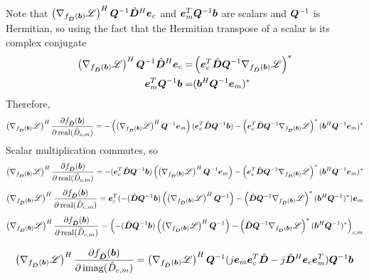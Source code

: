 \begin{appendices}
Note that $\left(\nabla_{f_{\hat{\bm{D}}}(\bm{b})} \mathscr{L}\right)^H\bm{Q}^{-1}\hat{\bm{D}}^H\bm{e}_c$ and $\bm{e}_m^T\bm{Q}^{-1}\bm{b}$ are scalars and $\bm{Q}^{-1}$ is Hermitian, so using the fact that the Hermitian transpose of a scalar is its complex conjugate
\begin{equation}
\begin{split}
\left(\nabla_{f_{\hat{\bm{D}}}(\bm{b})} \mathscr{L}\right)^H\bm{Q}^{-1}\hat{\bm{D}}^H\bm{e}_c = & \left(\bm{e}_c^T\hat{\bm{D}}\bm{Q}^{-1}\nabla_{f_{\hat{\bm{D}}}(\bm{b})} \mathscr{L}\right)^*
\\
\bm{e}_m^T\bm{Q}^{-1}\bm{b} = & (\bm{b}^H\bm{Q}^{-1}\bm{e}_m)^*
\end{split}
\end{equation}
Therefore,
\begin{equation}
\left(\nabla_{f_{\hat{\bm{D}}}(\bm{b})} \mathscr{L}\right)^H\frac{\partial f_{\hat{\bm{D}}}(\bm{b})}{\partial \operatorname{real}(\hat{D}_{c,m})} = -\left(\left(\nabla_{f_{\hat{\bm{D}}}(\bm{b})} \mathscr{L}\right)^H\bm{Q}^{-1}\bm{e}_m\right)(\bm{e}_c^T\hat{\bm{D}}\bm{Q}^{-1}\bm{b}) - \left(\bm{e}_c^T\hat{\bm{D}}\bm{Q}^{-1}\nabla_{f_{\hat{\bm{D}}}(\bm{b})} \mathscr{L}\right)^* (\bm{b}^H\bm{Q}^{-1}\bm{e}_m)^*
\end{equation}
Scalar multiplication commutes, so
\begin{equation}
\left(\nabla_{f_{\hat{\bm{D}}}(\bm{b})} \mathscr{L}\right)^H\frac{\partial f_{\hat{\bm{D}}}(\bm{b})}{\partial \operatorname{real}(\hat{D}_{c,m})} = -(\bm{e}_c^T\hat{\bm{D}}\bm{Q}^{-1}\bm{b})\left(\left(\nabla_{f_{\hat{\bm{D}}}(\bm{b})} \mathscr{L}\right)^H\bm{Q}^{-1}\bm{e}_m\right) - \left(\bm{e}_c^T\hat{\bm{D}}\bm{Q}^{-1}\nabla_{f_{\hat{\bm{D}}}(\bm{b})} \mathscr{L}\right)^* (\bm{b}^H\bm{Q}^{-1}\bm{e}_m)^*
\end{equation}
\begin{equation}
\left(\nabla_{f_{\hat{\bm{D}}}(\bm{b})} \mathscr{L}\right)^H\frac{\partial f_{\hat{\bm{D}}}(\bm{b})}{\partial \operatorname{real}(\hat{D}_{c,m})} = \bm{e}_c^T(-(\hat{\bm{D}}\bm{Q}^{-1}\bm{b})\left(\left(\nabla_{f_{\hat{\bm{D}}}(\bm{b})} \mathscr{L}\right)^H\bm{Q}^{-1}\right) - \left(\hat{\bm{D}}\bm{Q}^{-1}\nabla_{f_{\hat{\bm{D}}}(\bm{b})} \mathscr{L}\right)^* (\bm{b}^H\bm{Q}^{-1})^*)\bm{e}_m
\end{equation}
\begin{equation}
\left(\nabla_{f_{\hat{\bm{D}}}(\bm{b})} \mathscr{L}\right)^H\frac{\partial f_{\hat{\bm{D}}}(\bm{b})}{\partial \operatorname{real}(\hat{D}_{c,m})} = \left(-(\hat{\bm{D}}\bm{Q}^{-1}\bm{b})\left(\left(\nabla_{f_{\hat{\bm{D}}}(\bm{b})} \mathscr{L}\right)^H\bm{Q}^{-1}\right) - \left(\hat{\bm{D}}\bm{Q}^{-1}\nabla_{f_{\hat{\bm{D}}}(\bm{b})} \mathscr{L}\right)^* (\bm{b}^H\bm{Q}^{-1})^*\right)_{c,m}
\end{equation}

\begin{equation}
\left(\nabla_{f_{\hat{\bm{D}}}(\bm{b})} \mathscr{L}\right)^H\frac{\partial f_{\hat{\bm{D}}}(\bm{b})}{\partial \operatorname{imag}(\hat{D}_{c,m})} = \left(\nabla_{f_{\hat{\bm{D}}}(\bm{b})} \mathscr{L}\right)^H\bm{Q}^{-1}(j\bm{e}_m\bm{e}_c^T\hat{\bm{D}} - j\hat{\bm{D}}^H\bm{e}_c\bm{e}_m^T)\bm{Q}^{-1}\bm{b}
\end{equation}


\end{appendices}
